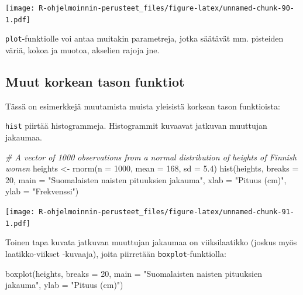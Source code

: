 \documentclass[
]{book}
\newenvironment{Shaded}{\begin{snugshade}}{\end{snugshade}}
\newcommand{\AttributeTok}[1]{\textcolor[rgb]{0.77,0.63,0.00}{#1}}
\newcommand{\CommentTok}[1]{\textcolor[rgb]{0.56,0.35,0.01}{\textit{#1}}}
\newcommand{\DecValTok}[1]{\textcolor[rgb]{0.00,0.00,0.81}{#1}}
\newcommand{\FloatTok}[1]{\textcolor[rgb]{0.00,0.00,0.81}{#1}}
\newcommand{\FunctionTok}[1]{\textcolor[rgb]{0.00,0.00,0.00}{#1}}
\newcommand{\NormalTok}[1]{#1}
\newcommand{\OtherTok}[1]{\textcolor[rgb]{0.56,0.35,0.01}{#1}}
\newcommand{\StringTok}[1]{\textcolor[rgb]{0.31,0.60,0.02}{#1}}
\begin{document}
\texttt{[image: R-ohjelmoinnin-perusteet\_files/figure-latex/unnamed-chunk-90-1.pdf]}

\texttt{plot}-funktiolle voi antaa muitakin parametreja, jotka säätävät mm. pisteiden väriä, kokoa ja muotoa, akselien rajoja jne.

\hypertarget{muut-korkean-tason-funktiot}{%
\subsection{Muut korkean tason funktiot}\label{muut-korkean-tason-funktiot}}

Tässä on esimerkkejä muutamista muista yleisistä korkean tason funktioista:

\texttt{hist} piirtää histogrammeja. Histogrammit kuvaavat jatkuvan muuttujan jakaumaa.

\begin{Shaded}
\begin{Highlighting}[]
\CommentTok{\# A vector of 1000 observations from a normal distribution of heights of Finnish women}
\NormalTok{heights }\OtherTok{\textless{}{-}} \FunctionTok{rnorm}\NormalTok{(}\AttributeTok{n =} \DecValTok{1000}\NormalTok{, }\AttributeTok{mean =} \DecValTok{168}\NormalTok{, }\AttributeTok{sd =} \FloatTok{5.4}\NormalTok{)}
\FunctionTok{hist}\NormalTok{(heights, }\AttributeTok{breaks =} \DecValTok{20}\NormalTok{, }
     \AttributeTok{main =} \StringTok{"Suomalaisten naisten pituuksien jakauma"}\NormalTok{,}
     \AttributeTok{xlab =} \StringTok{"Pituus (cm)"}\NormalTok{, }\AttributeTok{ylab =} \StringTok{"Frekvenssi"}\NormalTok{)}
\end{Highlighting}
\end{Shaded}

\texttt{[image: R-ohjelmoinnin-perusteet\_files/figure-latex/unnamed-chunk-91-1.pdf]}

Toinen tapa kuvata jatkuvan muuttujan jakaumaa on viiksilaatikko (joskus myös laatikko-viikset -kuvaaja), joita piirretään \texttt{boxplot}-funktiolla:

\begin{Shaded}
\begin{Highlighting}[]
\FunctionTok{boxplot}\NormalTok{(heights, }\AttributeTok{breaks =} \DecValTok{20}\NormalTok{, }
     \AttributeTok{main =} \StringTok{"Suomalaisten naisten pituuksien jakauma"}\NormalTok{,}
     \AttributeTok{ylab =} \StringTok{"Pituus (cm)"}\NormalTok{)}
\end{Highlighting}
\end{Shaded}
\end{document}
